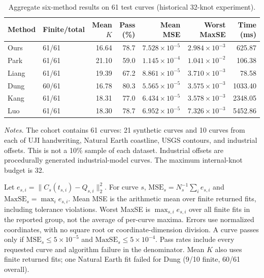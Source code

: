 \documentclass[10pt]{article}
\begin{document}
\begin{table}[htbp]
\centering
\small
\setlength{\tabcolsep}{5pt}
\caption{Aggregate six-method results on 61 test curves (historical 32-knot experiment).}
\label{tab:six-methods-overall}
\begin{tabular}{llrrrrr}
\toprule
Method & Finite/total & Mean $K$ & Pass (\%) & Mean MSE & Worst MaxSE & Time (ms) \\
\midrule
Ours & 61/61 & 16.64 & 78.7 & $7.528\times10^{-5}$ & $2.984\times10^{-3}$ & 625.87 \\
Park & 61/61 & 21.10 & 59.0 & $1.145\times10^{-4}$ & $1.041\times10^{-2}$ & 106.38 \\
Liang & 61/61 & 19.39 & 67.2 & $8.861\times10^{-5}$ & $3.710\times10^{-3}$ & 78.58 \\
Dung & 60/61 & 16.78 & 80.3 & $5.565\times10^{-5}$ & $3.575\times10^{-3}$ & 1033.40 \\
Kang & 61/61 & 18.31 & 77.0 & $6.434\times10^{-5}$ & $3.578\times10^{-3}$ & 2348.05 \\
Luo & 61/61 & 18.30 & 78.7 & $6.952\times10^{-5}$ & $7.326\times10^{-3}$ & 5452.86 \\
\bottomrule
\end{tabular}
\end{table}

\noindent\textit{Notes.}
The cohort contains 61 curves: 21 synthetic curves and 10 curves from each of UJI handwriting, Natural Earth coastline, USGS contours, and industrial offsets.
This is not a 10\% sample of each dataset. Industrial offsets are procedurally generated industrial-model curves.
The maximum internal-knot budget is 32.

Let $e_{s,i}=\|C_s(t_{s,i})-Q_{s,i}\|_2^2$.
For curve $s$, $\mathrm{MSE}_s=N_s^{-1}\sum_i e_{s,i}$ and $\mathrm{MaxSE}_s=\max_i e_{s,i}$.
Mean MSE is the arithmetic mean over finite returned fits, including tolerance violations.
Worst MaxSE is $\max_{s,i}e_{s,i}$ over all finite fits in the reported group, not the average of per-curve maxima.
Errors use normalized coordinates, with no square root or coordinate-dimension division.
A curve passes only if $\mathrm{MSE}_s\leq5\times10^{-5}$ and $\mathrm{MaxSE}_s\leq5\times10^{-4}$.
Pass rates include every requested curve and algorithm failure in the denominator.
Mean $K$ also uses finite returned fits; one Natural Earth fit failed for Dung (9/10 finite, 60/61 overall).
\end{document}
